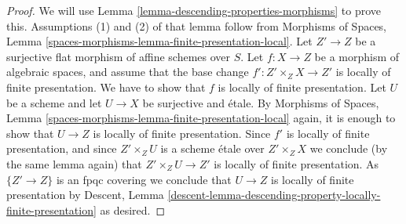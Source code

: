 \documentclass[10pt,a4paper]{amsart}
\theoremstyle{plain}
\theoremstyle{definition}
\theoremstyle{remark}
\numberwithin{equation}{subsection}
\begin{document}
\begin{proof}
We will use
Lemma \ref{lemma-descending-properties-morphisms}
to prove this. Assumptions (1) and (2) of that lemma follow from
Morphisms of Spaces,
Lemma \ref{spaces-morphisms-lemma-finite-presentation-local}.
Let $Z' \to Z$ be a surjective flat morphism of affine schemes over $S$.
Let $f : X \to Z$ be a morphism of algebraic spaces, and assume
that the base change $f' : Z' \times_Z X \to Z'$ is locally of
finite presentation.
We have to show that $f$ is locally of finite presentation. Let $U$ be a scheme
and let $U \to X$ be surjective and \'etale. By
Morphisms of Spaces,
Lemma \ref{spaces-morphisms-lemma-finite-presentation-local}
again, it is enough to show that $U \to Z$ is locally of finite presentation.
Since $f'$ is locally of finite presentation, and since $Z' \times_Z U$ is a
scheme \'etale over $Z' \times_Z X$ we conclude (by the same lemma again) that
$Z' \times_Z U \to Z'$ is locally of finite presentation.
As $\{Z' \to Z\}$ is an fpqc covering we conclude that
$U \to Z$ is locally of finite presentation by
Descent,
Lemma \ref{descent-lemma-descending-property-locally-finite-presentation}
as desired.
\end{proof}
\end{document}
